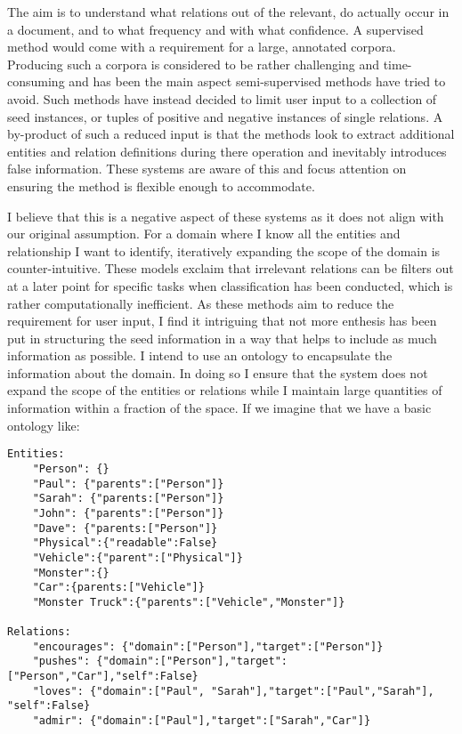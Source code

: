 \documentclass{ecmm427_assignment}
\begin{document}
The aim is to understand what relations out of the relevant, do actually occur in a document, and to what frequency and with what confidence. A supervised method would come with a requirement for a large, annotated corpora. Producing such a corpora is considered to be rather challenging and time-consuming and has been the main aspect semi-supervised methods have tried to avoid. \cite{selfsupervisedExtraction}\cite{learningPartWhole}\cite{espressoExtraction} Such methods have instead decided to limit user input to a collection of seed instances, or tuples of positive and negative instances of single relations.\cite{snowball} \cite{selfsupervisedExtraction}\cite{unsupervisedEntity}  A by-product of such a reduced input is that the methods look to extract additional entities and relation definitions during there operation and inevitably introduces false information. These systems are aware of this and focus attention on ensuring the method is flexible enough to accommodate.

I believe that this is a negative aspect of these systems as it does not align with our original assumption. For a domain where I know all the entities and relationship I want to identify, iteratively expanding the scope of the domain is counter-intuitive. These models exclaim that irrelevant relations can be filters out at a later point for specific tasks when classification has been conducted, which is rather computationally inefficient. As these methods aim to reduce the requirement for user input, I find it intriguing that not more enthesis has been put in structuring the seed information in a way that helps to include as much information as possible. I intend to use an ontology to encapsulate the information about the domain. In doing so I ensure that the system does not expand the scope of the entities or relations while I maintain large quantities of information within a fraction of the space. If we imagine that we have a basic ontology like:

\begin{verbatim}
Entities:
    "Person": {}
    "Paul": {"parents":["Person"]}
    "Sarah": {"parents:["Person"]}
    "John": {"parents":["Person"]}
    "Dave": {"parents:["Person"]}
    "Physical":{"readable":False}
    "Vehicle":{"parent":["Physical"]}
    "Monster":{}
    "Car":{parents:["Vehicle"]}
    "Monster Truck":{"parents":["Vehicle","Monster"]}
    
Relations:
    "encourages": {"domain":["Person"],"target":["Person"]}
    "pushes": {"domain":["Person"],"target":["Person","Car"],"self":False}
    "loves": {"domain":["Paul", "Sarah"],"target":["Paul","Sarah"], "self":False}
    "admir": {"domain":["Paul"],"target":["Sarah","Car"]}  
    

\end{verbatim}
\end{document}
